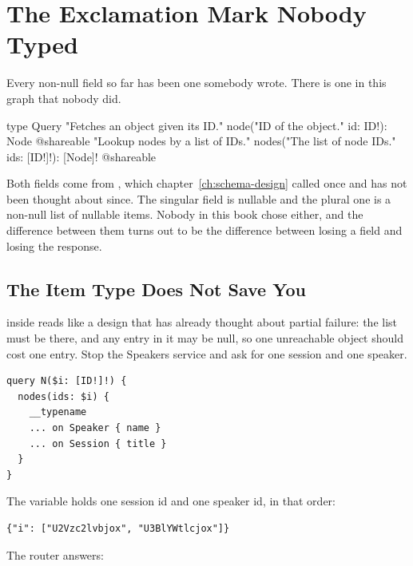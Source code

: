 \section{The Exclamation Mark Nobody Typed}
\label{sec:ch14-the-exclamation-mark-nobody-typed}

%
Every non-null field so far has been one somebody wrote. There is one in this
graph that nobody did.

\begin{graphqlsdl}
type Query {
  "Fetches an object given its ID."
  node("ID of the object." id: ID!): Node @shareable
  "Lookup nodes by a list of IDs."
  nodes("The list of node IDs." ids: [ID!]!): [Node]! @shareable
}
\end{graphqlsdl}

%
Both fields come from , which
chapter~\ref{ch:schema-design} called once and has not been thought about
since. The singular field is nullable and the plural one is a non-null list of
nullable items. Nobody in this book chose either, and the difference between
them turns out to be the difference between losing a field and losing the
response.

\subsection{The Item Type Does Not Save You}

%
\code{[Node]} inside \code{[Node]!} reads like a design that has already thought
about partial failure: the list must be there, and any entry in it may be null,
so one unreachable object should cost one entry. Stop the Speakers service and
ask for one session and one speaker.

\begin{verbatim}
query N($i: [ID!]!) {
  nodes(ids: $i) {
    __typename
    ... on Speaker { name }
    ... on Session { title }
  }
}
\end{verbatim}

The variable holds one session id and one speaker id, in that order:

\begin{verbatim}
{"i": ["U2Vzc2lvbjox", "U3BlYWtlcjox"]}
\end{verbatim}

The router answers:

